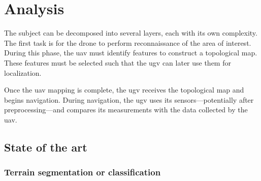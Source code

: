 \chapter{Analysis}\label{ch:analysis}

The subject can be decomposed into several layers, each with its own complexity.
The first task is for the drone to perform reconnaissance of the area of interest.
During this phase, the \gls{uav} must identify features to construct a topological map.
These features must be selected such that the \gls{ugv} can later use them for localization.

Once the \gls{uav} mapping is complete, the \gls{ugv} receives the topological map and begins navigation.
During navigation, the \gls{ugv} uses its sensors—potentially after preprocessing—and compares its measurements with the data collected by the \gls{uav}.


\section{State of the art}\label{sec:state-of-the-art}


\subsection{Terrain segmentation or classification}

